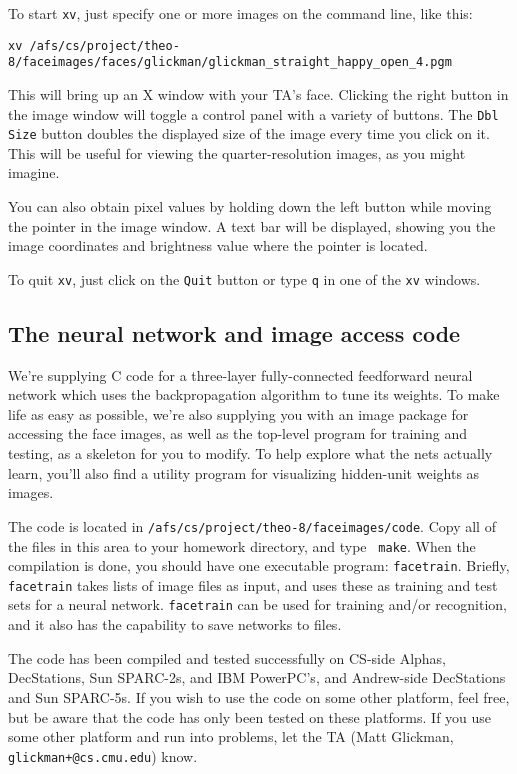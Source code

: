 To start {\tt xv}, just specify one or more images on the command line,
like this:

{\tt xv /afs/cs/project/theo-8/faceimages/faces/glickman/glickman\_straight\_happy\_open\_4.pgm}

This will bring up an X window with your TA's face.  Clicking the right
button in the image window will toggle a control panel with a variety of
buttons.  The {\tt Dbl Size} button doubles the displayed size of the
image every time you click on it.  This will be useful for viewing
the quarter-resolution images, as you might imagine.

You can also obtain pixel values by holding down the left button while
moving the pointer in the image window.  A text bar will be displayed, showing
you the image coordinates and brightness value where the pointer is located.

To quit {\tt xv}, just click on the {\tt Quit} button or type {\tt q}
in one of the {\tt xv} windows.

\subsection{The neural network and image access code}

We're supplying C code for a three-layer fully-connected feedforward
neural network which uses the backpropagation algorithm to tune its weights.
To make life as easy as possible, we're also supplying you with an image
package for accessing the face images, as well as the top-level
program for training and testing, as a skeleton for you to modify.
To help explore what the nets actually learn, you'll also find a
utility program for visualizing hidden-unit weights as images.

The code is located in {\tt /afs/cs/project/theo-8/faceimages/code}.  Copy
all of the files in this area to your homework directory, and type {\tt
make}.  When the compilation is done, you should have one executable
program: {\tt facetrain}.  Briefly, {\tt facetrain} takes lists of image
files as input, and uses these as training and test sets for a neural
network.  {\tt facetrain} can be used for training and/or recognition,
and it also has the capability to save networks to files.

The code has been compiled and tested successfully on CS-side Alphas,
DecStations, Sun SPARC-2s, and IBM PowerPC's, and Andrew-side DecStations
and Sun SPARC-5s.
If you wish to use the code on some other platform, feel free, but be
aware that the code has only been tested on these platforms.  If you
use some other platform and run into problems, let the TA (Matt Glickman,
{\tt glickman+@cs.cmu.edu}) know.

